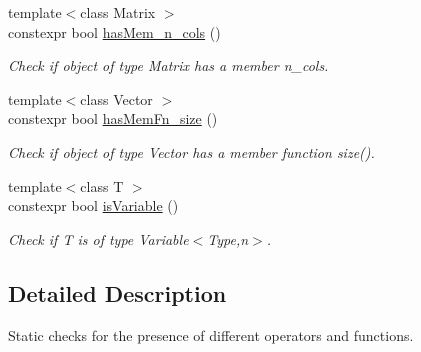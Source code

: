 \begin{DoxyCompactItemize}
{\footnotesize template$<$class Matrix $>$ }\\constexpr bool \hyperlink{group__ConceptCheck_ga0a87aaa714499abcaabd921297be61e4}{has\+Mem\+\_\+n\+\_\+cols} ()
\begin{DoxyCompactList}\small\item\em Check if object of type Matrix has a member n\+\_\+cols. \end{DoxyCompactList}\item 
{\footnotesize template$<$class Vector $>$ }\\constexpr bool \hyperlink{group__ConceptCheck_ga5e3c3b091f6457e00e7c238cb27def3c}{has\+Mem\+Fn\+\_\+size} ()
\begin{DoxyCompactList}\small\item\em Check if object of type Vector has a member function size(). \end{DoxyCompactList}\item 
{\footnotesize template$<$class T $>$ }\\constexpr bool \hyperlink{group__ConceptCheck_gac2a1a8aedf54c42cb6d47b3b64bbc761}{is\+Variable} ()
\begin{DoxyCompactList}\small\item\em Check if T is of type Variable$<$\+Type,n$>$. \end{DoxyCompactList}\end{DoxyCompactItemize}


\subsection{Detailed Description}
Static checks for the presence of different operators and functions. 